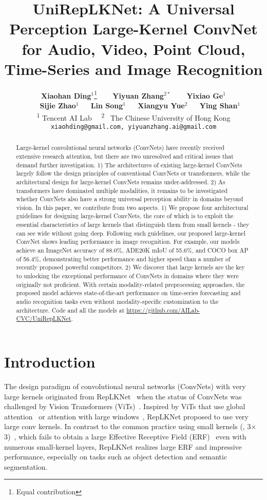 \documentclass[10pt,twocolumn,letterpaper]{article}
\title{UniRepLKNet: A Universal Perception Large-Kernel ConvNet for Audio, Video, Point Cloud, Time-Series and Image Recognition}
\author{
	\textbf{Xiaohan Ding}$^{1}$\thanks{Equal contribution}
	~~~ \textbf{Yiyuan Zhang}$^{2\ast}$
	~~~ \textbf{Yixiao Ge}$^{1}$\\
	~~~ \textbf{Sijie Zhao}$^{1}$
        \quad \quad~~ \textbf{Lin Song}$^{1}$
        \quad \quad~~ \textbf{Xiangyu Yue}$^{2}$
	\quad \quad~~ \textbf{Ying Shan}$^{1}$ \\
	\textsuperscript{1} Tencent AI Lab
        \quad 
	~~\textsuperscript{2}~ The Chinese University of Hong Kong\\
	{\tt\small xiaohding@gmail.com,
        yiyuanzhang.ai@gmail.com} 
}
\begin{document}
\maketitle
\begin{abstract}
Large-kernel convolutional neural networks (ConvNets) have recently received extensive research attention, but there are two unresolved and critical issues that demand further investigation. 1) The architectures of existing large-kernel ConvNets largely follow the design principles of conventional ConvNets or transformers, while the architectural design for large-kernel ConvNets remains under-addressed. 2) As transformers have dominated multiple modalities, it remains to be investigated whether ConvNets also have a strong universal perception ability in domains beyond vision. In this paper, we contribute from two aspects. 1) We propose four architectural guidelines for designing large-kernel ConvNets, the core of which is to exploit the essential characteristics of large kernels that distinguish them from small kernels - they can see wide without going deep. Following such guidelines, our proposed large-kernel ConvNet shows leading performance in image recognition. For example, our models achieve an ImageNet accuracy of 88.0\%, ADE20K mIoU of 55.6\%, and COCO box AP of 56.4\%, demonstrating better performance and higher speed than a number of recently proposed powerful competitors. 2) We discover that large kernels are the key to unlocking the exceptional performance of ConvNets in domains where they were originally not proficient. With certain modality-related preprocessing approaches, the proposed model achieves state-of-the-art performance on time-series forecasting and audio recognition tasks even without modality-specific customization to the architecture. Code and all the models at \url{https://github.com/AILab-CVC/UniRepLKNet}.
\end{abstract} \section{Introduction}
\label{sec:intro}

The design paradigm of convolutional neural networks (ConvNets) with very large kernels originated from RepLKNet~\cite{ding2022scaling} when the status of ConvNets was challenged by Vision Transformers (ViTs)~\cite{vit,swin,deit,pvt}. Inspired by ViTs that use global attention~\cite{vit,pvt,bot} or attention with large windows~\cite{swin,halonet,sasa}, RepLKNet proposed to use very large conv kernels. In contrast to the common practice using small kernels (\eg, 3$\times$3)~\cite{simonyan2014very,he2016deep,zhang2018shufflenet,mbv1,huang2017densely,efficientnet,regnet}, which fails to obtain a large Effective Receptive Field (ERF)~\cite{erf} even with numerous small-kernel layers, RepLKNet realizes large ERF and impressive performance, especially on tasks such as object detection and semantic segmentation. 
\end{document}
